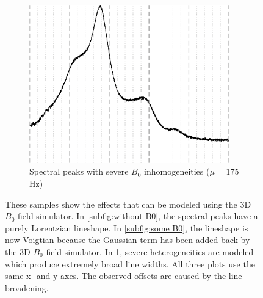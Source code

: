 \begin{figure}
\begin{subfigure}{0.32\textwidth}
    \end{subfigure}
    \begin{subfigure}{0.32\textwidth}
        \centering
        \includegraphics[width=0.95\textwidth,keepaspectratio]{images/b0_peaks/with_B0.eps}
        \caption{Spectral peaks with severe $B_0$ inhomogeneities ($\mu = 175$Hz)}
        \label{subfig:with B0}        
    \end{subfigure}
    \caption{These samples show the effects that can be modeled using the 3D $B_0$ field simulator. In \ref{subfig:without B0}, the spectral peaks have a purely Lorentzian lineshape. In \ref{subfig:some B0}, the lineshape is now Voigtian because the Gaussian term has been added back by the 3D $B_0$ field simulator. In \ref{subfig:with B0}, severe heterogeneities are modeled which produce extremely broad line widths. All three plots use the same x- and y-axes. The observed offsets are caused by the line broadening.}
    \label{fig:B0 effects}
\end{figure}
